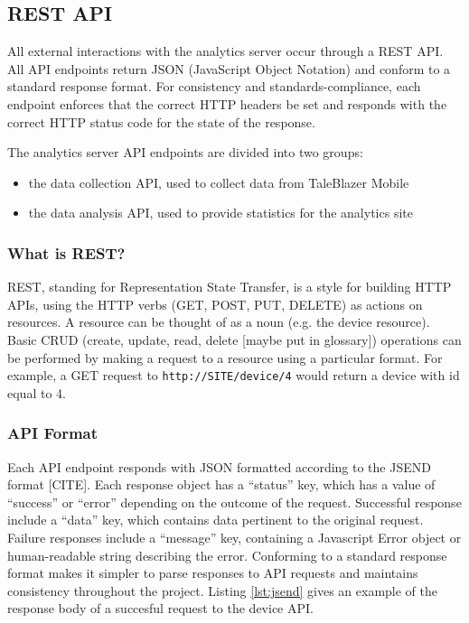 \subsection{REST API}

All external interactions with the analytics server occur through a REST API. All API endpoints return JSON (JavaScript Object Notation) and conform to a standard response format. For consistency and standards-compliance, each endpoint enforces that the correct HTTP headers be set and responds with the correct HTTP status code for the state of the response.

The analytics server API endpoints are divided into two groups:
	\begin{itemize}
		\item the data collection API, used to collect data from TaleBlazer Mobile
		\item the data analysis API, used to provide statistics for the analytics site
	\end{itemize}


\subsubsection{What is REST?}
REST, standing for Representation State Transfer, is a style for building HTTP APIs, using the HTTP verbs (GET, POST, PUT, DELETE) as actions on resources. A resource can be thought of as a noun (e.g. the device resource). Basic CRUD (create, update, read, delete [maybe put in glossary]) operations can be performed by making a request to a resource using a particular format. For example, a GET request to \texttt{http://SITE/device/4} would return a device with id equal to 4. 

\subsubsection{API Format}

Each API endpoint responds with JSON formatted according to the JSEND format [CITE]. Each response object has a ``status'' key, which has a value of ``success'' or ``error'' depending on the outcome of the request. Successful response include a ``data'' key, which contains data pertinent to the original request. Failure responses include a ``message'' key, containing a Javascript Error object or human-readable string describing the error. Conforming to a standard response format makes it simpler to parse responses to API requests and maintains consistency throughout the project. Listing \ref{lst:jsend} gives an example of the response body of a succesful request to the device API.

